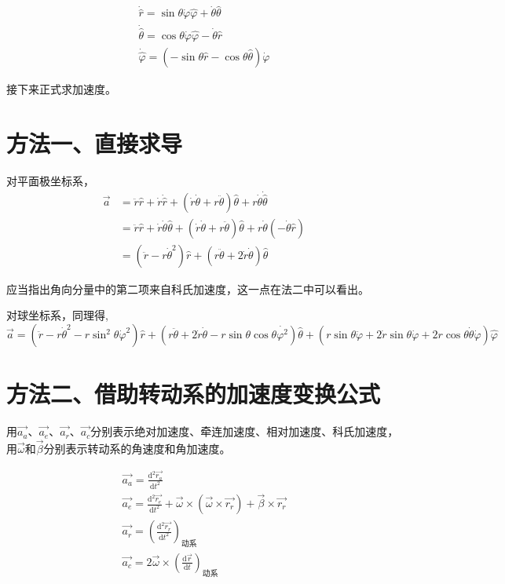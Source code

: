 \documentclass{ctexart}
\begin{document}
    \begin{gather*}
        \dot{\hat{r}} = \sin\theta\dot{\varphi}\hat{\varphi}+\dot{\theta}\hat{\theta} \\
        \dot{\hat{\theta}} = \cos\theta\dot{\varphi}\hat{\varphi}-\dot{\theta}\hat{r} \\
        \dot{\hat{\varphi}} = (-\sin\theta\hat{r}-\cos\theta\hat{\theta})\dot{\varphi}
    \end{gather*}

    接下来正式求加速度。

    \section{方法一、直接求导}\label{sec:2}

    对平面极坐标系，
    \begin{align*}
        \vec{a} &= \ddot{r}\hat{r}+\dot{r}\dot{\hat{r}}+(\dot{r}\dot{\theta}+r\ddot{\theta})\hat{\theta}
        +r\dot{\theta}\dot{\hat{\theta}} \\
        &= \ddot{r}\hat{r}+\dot{r}\dot{\theta}\hat{\theta}+(\dot{r}\dot{\theta}+r\ddot{\theta})
        \hat{\theta}+r\dot{\theta}(-\dot{\theta}\hat{r}) \\
        &= (\ddot{r}-r\dot{\theta}^2)\hat{r}+(r\ddot{\theta}+2\dot{r}\dot{\theta})\hat{\theta}
    \end{align*}

    应当指出角向分量中的第二项来自科氏加速度，这一点在法二中可以看出。

    对球坐标系，同理得,
    \begin{equation*}
        \vec{a} = (\ddot{r}-r\dot{\theta}^2-r\sin^2\theta\dot{\varphi}^2)\hat{r}+
        (r\ddot{\theta}+2\dot{r}\dot{\theta}-r\sin\theta\cos\theta\dot{\varphi^2})\hat{\theta}+
        (r\sin\theta\ddot{\varphi}+2\dot{r}\sin\theta\dot{\varphi}+
        2r\cos\theta\dot{\theta}\dot{\varphi})\hat{\varphi}
    \end{equation*}

    \section{方法二、借助转动系的加速度变换公式}\label{sec:3}

    用$\vec{a_a}$、$\vec{a_e}$、$\vec{a_r}$、$\vec{a_c}$分别表示绝对加速度、牵连加速度、相对加速度、科氏加速度，
    用$\vec{\omega}$和$\vec{\beta}$分别表示转动系的角速度和角加速度。

    \begin{gather*}
        \vec{a_a} = \frac{\mathrm{d}^2\vec{r_a}}{\mathrm{d}t^2} \\
        \vec{a_e} = \frac{\mathrm{d}^2\vec{r_e}}{\mathrm{d}t^2}+
        \vec{\omega}\times(\vec{\omega}\times\vec{r_r})+
        \vec{\beta}\times\vec{r_r} \\
        \vec{a_r} = (\frac{\mathrm{d}^2\vec{r_r}}{\mathrm{d}t^2})_{\text{动系}} \\
        \vec{a_c} = 2\vec{\omega}\times(\frac{\mathrm{d}\vec{r}}{\mathrm{d}t})_{\text{动系}}
    \end{gather*}
\end{document}
